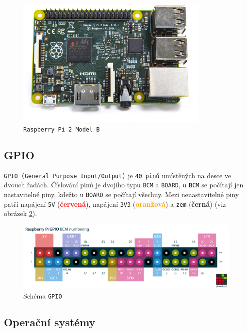 \documentclass[czech,BP]{thesiskiv}
\begin{document}
		\begin{figure}[H]
		\centering
		\includegraphics[width=0.85\textwidth]{../images/rpi2.jpg}	
		\caption{\texttt{Raspberry Pi 2 Model B}}
		\label{fig:rpi2}
	\end{figure}
		
	

		\subsection{GPIO}
			\texttt{GPIO (General Purpose Input/Output)} je \texttt{40 pinů} umístěných na desce ve dvouch řadách. Číslování pinů je dvojího typu \texttt{BCM} a \texttt{BOARD}, u \texttt{BCM} se počítají jen nastavitelné piny, kdežto u \texttt{BOARD} se počítají všechny.
Mezi nenastavitelné piny patří napájení \texttt{5V} (\textcolor{red}{\textbf{červená}}), napájení \texttt{3V3} (\textcolor{orange}{\textbf{oranžová}}) a \texttt{zem} (\textbf{černá}) (viz obrázek \ref{fig:gpio}).	
		
		\begin{figure}[H]
   		 	\centering
			\includegraphics[width=1\textwidth]{../images/gpio.png}	
			\caption{Schéma \texttt{GPIO}}
    		\label{fig:gpio}
		\end{figure}		
		
		
		\subsection{Operační systémy}
\end{document}
